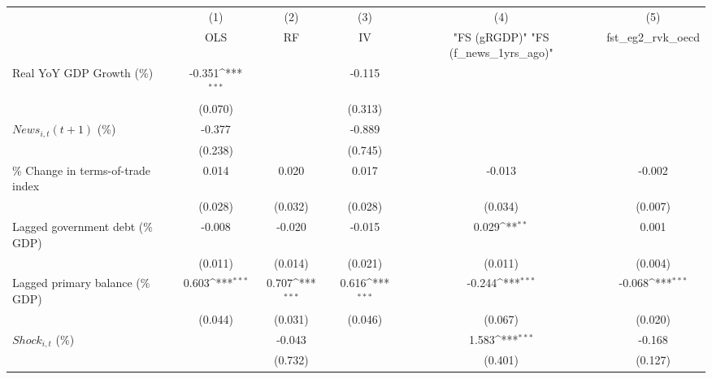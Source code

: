 {
\def\sym#1{\ifmmode^{#1}\else\(^{#1}\)\fi}
\begin{tabular}{l*{5}{c}}
\toprule
                    &\multicolumn{1}{c}{(1)}&\multicolumn{1}{c}{(2)}&\multicolumn{1}{c}{(3)}&\multicolumn{1}{c}{(4)}&\multicolumn{1}{c}{(5)}\\
                    &\multicolumn{1}{c}{OLS}&\multicolumn{1}{c}{RF}&\multicolumn{1}{c}{IV}&\multicolumn{1}{c}{ "FS (gRGDP)"  "FS (f_news_1yrs_ago)" }&\multicolumn{1}{c}{fst_eg2_rvk_oecd}\\
\midrule
Real YoY GDP Growth (\%)&      -0.351\sym{***}&                     &      -0.115         &                     &                     \\
                    &     (0.070)         &                     &     (0.313)         &                     &                     \\
\addlinespace
$ News_{i,t}(t+1)$ (\%)&      -0.377         &                     &      -0.889         &                     &                     \\
                    &     (0.238)         &                     &     (0.745)         &                     &                     \\
\addlinespace
\% Change in terms-of-trade index&       0.014         &       0.020         &       0.017         &      -0.013         &      -0.002         \\
                    &     (0.028)         &     (0.032)         &     (0.028)         &     (0.034)         &     (0.007)         \\
\addlinespace
Lagged government debt (\% GDP)&      -0.008         &      -0.020         &      -0.015         &       0.029\sym{**} &       0.001         \\
                    &     (0.011)         &     (0.014)         &     (0.021)         &     (0.011)         &     (0.004)         \\
\addlinespace
Lagged primary balance (\% GDP)&       0.603\sym{***}&       0.707\sym{***}&       0.616\sym{***}&      -0.244\sym{***}&      -0.068\sym{***}\\
                    &     (0.044)         &     (0.031)         &     (0.046)         &     (0.067)         &     (0.020)         \\
\addlinespace
$ Shock_{i,t}$ (\%) &                     &      -0.043         &                     &       1.583\sym{***}&      -0.168         \\
                    &                     &     (0.732)         &                     &     (0.401)         &     (0.127)         \\

\end{tabular}}
